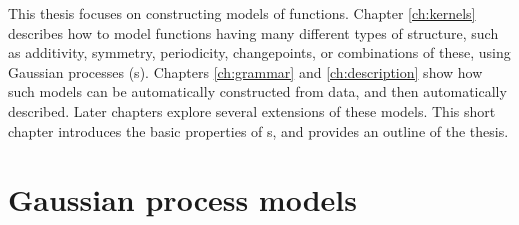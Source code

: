 This thesis focuses on constructing models of functions.
Chapter \ref{ch:kernels} describes how to model functions having many different types of structure, such as additivity, symmetry, periodicity, changepoints, or combinations of these, using Gaussian processes (\gp{}s).
Chapters \ref{ch:grammar} and \ref{ch:description} show how such models can be automatically constructed from data, and then automatically described.
Later chapters explore several extensions of these models.
%
%
This short chapter introduces the basic properties of \gp{}s, and provides an outline of the thesis.



\section{Gaussian process models}

